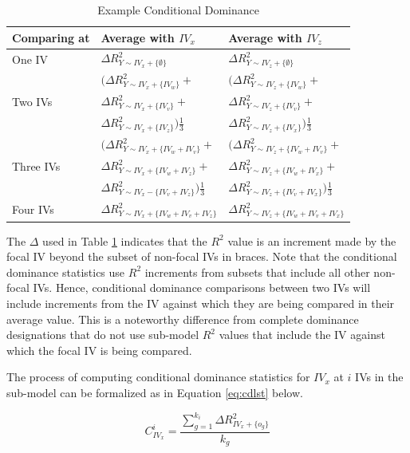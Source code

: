 \documentclass[doc]{apa7}
\begin{document}
	\begin{table}[h!]
		\centering
		\caption{\centering Example Conditional Dominance}
		\begin{tabular}{ l | l l }
			Comparing at & Average with $IV_x$ & Average with $IV_z$ \\
			\hline
			One IV & $\Delta R^2_{Y \sim IV_x + \{\emptyset\}}$ & $\Delta R^2_{Y \sim IV_z + \{\emptyset\}}$ \\
			\hline
			& $(\Delta R^2_{Y \sim IV_x + \{IV_w\}} + $ & $(\Delta R^2_{Y \sim IV_z + \{IV_w\}} + $ \\
			Two IVs & $\Delta R^2_{Y \sim IV_x + \{IV_v\}} + $ & $\Delta R^2_{Y \sim IV_z + \{IV_v\}} + $ \\
			& $\Delta R^2_{Y \sim IV_x + \{IV_z\}})\frac{1}{3}$ & $\Delta R^2_{Y \sim IV_z + \{IV_x\}})\frac{1}{3} $ \\
			\hline
			& $(\Delta R^2_{Y \sim IV_x + \{IV_w + IV_v\}} + $ & $(\Delta R^2_{Y \sim IV_z + \{IV_w + IV_v\}} + $ \\
			Three IVs & $\Delta R^2_{Y \sim IV_x + \{IV_w + IV_z\}} + $ & $\Delta R^2_{Y \sim IV_z + \{IV_w + IV_x\}} + $ \\
			& $\Delta R^2_{Y \sim IV_x - \{IV_v + IV_z\}})\frac{1}{3}$ & $\Delta R^2_{Y \sim IV_z + \{IV_v + IV_x\}})\frac{1}{3}$ \\
			\hline
			Four IVs & $\Delta R^2_{Y \sim IV_x + \{IV_w + IV_v + IV_z\}}$ & $\Delta R^2_{Y \sim IV_z + \{IV_w + IV_v + IV_x\}}$ \\
			\hline
		\end{tabular}
		\label{tab:excdl}
	\end{table}
	
	The $\Delta$ used in Table \ref{tab:excdl} indicates that the $R^2$ value is an increment made by the focal IV beyond the subset of non-focal IVs in braces.
	Note that the conditional dominance statistics use $R^2$ increments from subsets that include all other non-focal IVs.
	Hence, conditional dominance comparisons between two IVs will include increments from the IV against which they are being compared in their average value.
	This is a noteworthy difference from complete dominance designations that do not use sub-model $R^2$ values that include the IV against which the focal IV is being compared.
	
	The process of computing conditional dominance statistics for $IV_x$ at $i$ IVs in the sub-model can be formalized as in Equation \ref{eq:cdlst} below.
	
	\begin{equation}
		C^{i}_{IV_x} = \frac{\sum^{k_i}_{g=1} \Delta R^2_{IV_x + \{o_g\}}}{k_g}
		\label{eq:cdlst}
	\end{equation}
	
\end{document}
